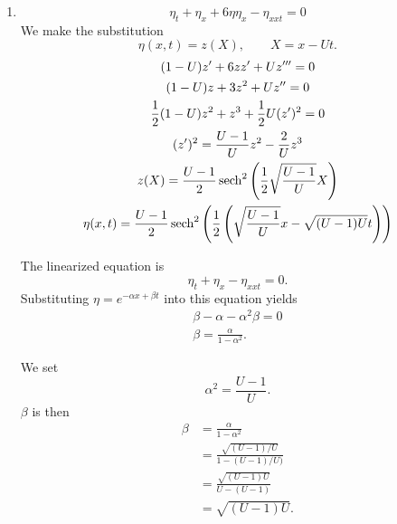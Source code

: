 \begin{Solution}
  \begin{enumerate}
  \item
    \[\eta_t + \eta_x + 6 \eta \eta_x - \eta_{xxt} = 0 \]
    We make the substitution
    \[ \eta(x,t) = z(X), \qquad X = x - U t. \]
    \begin{gather*}
      (1-U)z' + 6 z z' + U z''' = 0 \\
      (1-U)z + 3 z^2 + U z'' = 0 \\
      \frac{1}{2}(1-U)z^2 + z^3 + \frac{1}{2} U (z')^2 = 0 \\
      (z')^2 = \frac{U-1}{U}z^2  -\frac{2}{U}z^3 \\
      z(X) = \frac{U-1}{2} \mathop{\mathrm{sech}}\nolimits^2 \left(\frac{1}{2}\sqrt{\frac{U-1}{U}} X\right) \\
      \eta(x,t) = \frac{U-1}{2} \mathop{\mathrm{sech}}\nolimits^2 \left(\frac{1}{2}\left(\sqrt{\frac{U-1}{U}} 
          x - \sqrt{(U-1)U} t\right)\right) 
    \end{gather*}

    The linearized equation is
    \[\eta_t + \eta_x - \eta_{xxt} = 0. \]
    Substituting $\eta = e^{-\alpha x + \beta t}$ into this equation yields
    \begin{gather*}
      \beta - \alpha - \alpha^2 \beta = 0 \\
      \beta = \frac{\alpha}{1-\alpha^2}.
    \end{gather*}

    We set 
    \[ \alpha^2 = \frac{U-1}{U}. \]
    $\beta$ is then
    \begin{align*}
      \beta &= \frac{\alpha}{1-\alpha^2} \\
      &= \frac{\sqrt{(U-1)/U}}{1-(U-1)/U)} \\
      &= \frac{\sqrt{(U-1)U}}{U-(U-1)} \\
      &= \sqrt{(U-1)U}.
    \end{align*}


\end{enumerate}
\end{Solution}
